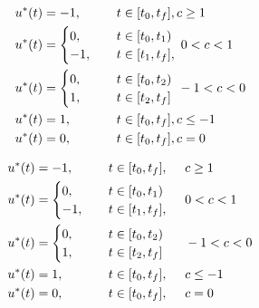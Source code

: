 \documentclass{article}
\begin{document}
\begin{alignat*}{2}
    u^*(t) &= -1, &&t\in[t_0, t_f], c \geq 1\\ 
    u^*(t) &= \begin{cases}
            0, \\
            -1, 
        \end{cases}&& \def\arraystretch{1.2}\begin{array}{@{}l}
        t\in[t_0, t_1)\\
        t\in[t_1, t_f],
        \end{array}
         0 < c < 1\\
    u^*(t) &= \begin{cases}
            0, \\
            1, 
    \end{cases} &&\def\arraystretch{1.2}\begin{array}{@{}l}
     t\in[t_0, t_2)\\
     t\in[t_2, t_f]
    \end{array}
     -1 < c < 0\\
    u^*(t) &= 1, &&t\in[t_0, t_f], c \leq -1\\
    u^*(t) &= 0, &&t\in[t_0, t_f], c = 0
\end{alignat*}

\begin{alignat*}{3}
    u^*(t) &= -1, &&t\in[t_0, t_f], &&c \geq 1\\ 
    u^*(t) &= \begin{cases}
            0, \\
            -1, 
        \end{cases}&& \def\arraystretch{1.2}\begin{array}{@{}l}
        t\in[t_0, t_1)\\
        t\in[t_1, t_f],
        \end{array}
         &&0 < c < 1\\
    u^*(t) &= \begin{cases}
            0, \\
            1, 
    \end{cases} &&\def\arraystretch{1.2}\begin{array}{@{}l}
     t\in[t_0, t_2)\\
     t\in[t_2, t_f]
    \end{array}
     &&-1 < c < 0\\
    u^*(t) &= 1, &&t\in[t_0, t_f], &&c \leq -1\\
    u^*(t) &= 0, &&t\in[t_0, t_f], &&c = 0
\end{alignat*}
\end{document}
